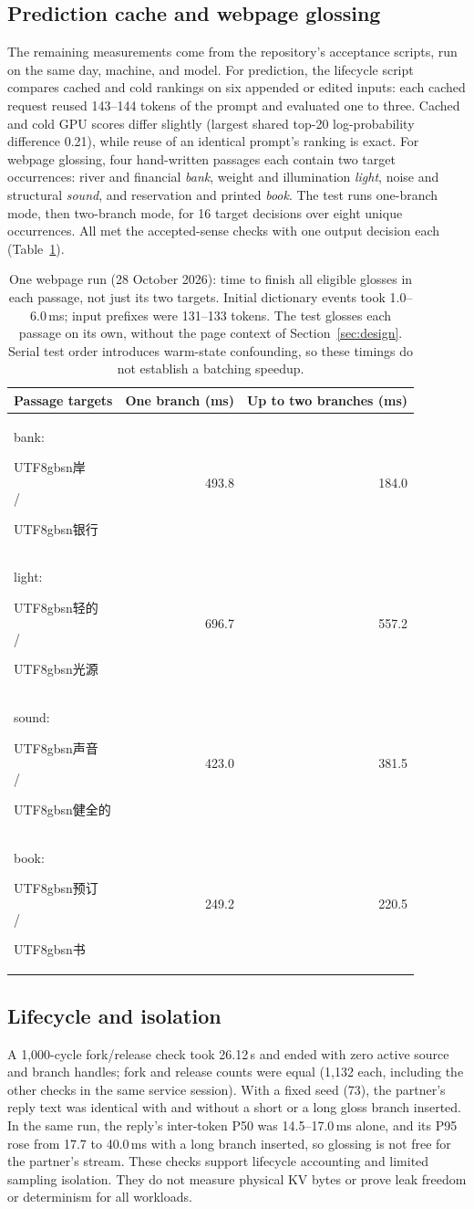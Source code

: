 \documentclass[11pt,a4paper]{article}
\newcommand{\zh}[1]{\begin{CJK}{UTF8}{gbsn}#1\end{CJK}}
\begin{document}
\subsection{Prediction cache and webpage glossing}
The remaining measurements come from the repository's acceptance scripts, run on the same day, machine, and model. For prediction, the lifecycle script compares cached and cold rankings on six appended or edited inputs: each cached request reused 143--144 tokens of the prompt and evaluated one to three. Cached and cold GPU scores differ slightly (largest shared top-20 log-probability difference 0.21), while reuse of an identical prompt's ranking is exact. For webpage glossing, four hand-written passages each contain two target occurrences: river and financial \emph{bank}, weight and illumination \emph{light}, noise and structural \emph{sound}, and reservation and printed \emph{book}. The test runs one-branch mode, then two-branch mode, for 16 target decisions over eight unique occurrences. All met the accepted-sense checks with one output decision each (Table~\ref{tab:reader}).

\begin{table}[ht]
\centering\small
\begin{tabular}{@{}lrr@{}}
\toprule
Passage targets & One branch (ms) & Up to two branches (ms)\\
\midrule
bank: \zh{岸} / \zh{银行} & 493.8 & 184.0\\
light: \zh{轻的} / \zh{光源} & 696.7 & 557.2\\
sound: \zh{声音} / \zh{健全的} & 423.0 & 381.5\\
book: \zh{预订} / \zh{书} & 249.2 & 220.5\\
\bottomrule
\end{tabular}
\caption{One webpage run (28 October 2026): time to finish all eligible glosses in each passage, not just its two targets. Initial dictionary events took 1.0--6.0\,ms; input prefixes were 131--133 tokens. The test glosses each passage on its own, without the page context of Section~\ref{sec:design}. Serial test order introduces warm-state confounding, so these timings do not establish a batching speedup.}
\label{tab:reader}
\end{table}

\subsection{Lifecycle and isolation}
A 1,000-cycle fork/release check took 26.12\,s and ended with zero active source and branch handles; fork and release counts were equal (1,132 each, including the other checks in the same service session). With a fixed seed (73), the partner's reply text was identical with and without a short or a long gloss branch inserted. In the same run, the reply's inter-token P50 was 14.5--17.0\,ms alone, and its P95 rose from 17.7 to 40.0\,ms with a long branch inserted, so glossing is not free for the partner's stream. These checks support lifecycle accounting and limited sampling isolation. They do not measure physical KV bytes or prove leak freedom or determinism for all workloads.
\end{document}
